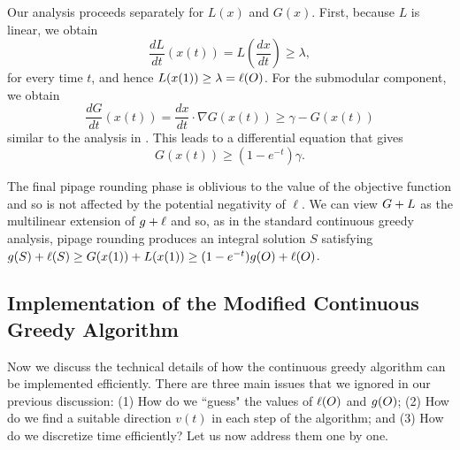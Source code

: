 \documentclass{article}
\theoremstyle{definition}
\begin{document}
Our analysis proceeds separately for $L(x)$ and $G(x)$. First, because $L$ is linear, we obtain
$$ \frac{dL}{dt}(x(t)) = L\left(\frac{dx}{dt}\right) \geq \lambda, $$
for every time $t$, and hence $L(x(1)) \geq \lambda = \ell(O)$. For the submodular component, we obtain
$$ \frac{dG}{dt}(x(t)) = \frac{dx}{dt} \cdot \nabla G(x(t)) \geq \gamma - G(x(t)) $$
similar to the analysis in \cite{Calinescu2011}. This leads to a differential equation that gives
$$G(x(t)) \geq (1 - e^{-t}) \gamma.$$

The final pipage rounding phase is oblivious to the value of the objective function and so is not affected by the potential negativity of $\ell$.  We can view $G + L$ as the multilinear extension of $g + \ell$ and so, as in the standard continuous greedy analysis, pipage rounding produces an integral solution $S$ satisfying $g(S) + \ell(S) \ge G(x(1)) + L(x(1)) \ge (1 - e^{-t})g(O) + \ell(O)$.

\subsection{Implementation of the Modified Continuous Greedy Algorithm}

Now we discuss the technical details of how the continuous greedy algorithm can be implemented efficiently.
There are three main issues that we ignored in our previous discussion: (1) How do we ``guess" the values of $\ell(O)$ and $g(O)$; 
(2) How do we find a suitable direction $v(t)$ in each step of the algorithm; and 
(3) How do we discretize time efficiently?  Let us now address them one by one.
\end{document}
